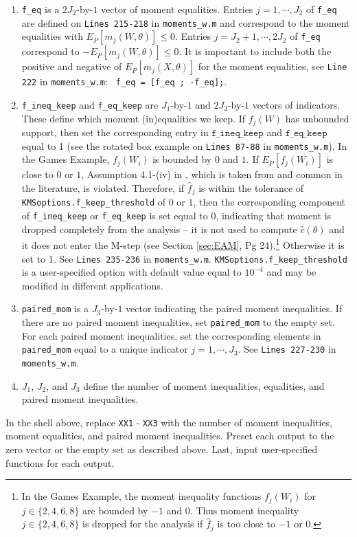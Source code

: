 \documentclass[12pt]{article}
\def\code#1{\texttt{#1}}
\begin{document}
\begin{enumerate}
    \item \code{f\_eq} is a $2 J_2$-by-$1$ vector of moment equalities.  Entries $j=1,\cdots,J_2$ of  \code{f\_eq} are defined on \code{Lines 215-218} in \code{moments\_w.m} and correspond to the moment equalities with $E_P[m_j(W,\theta)] \leq 0$.  Entries $j=J_2+1,\cdots,2J_2$ of  \code{f\_eq} correspond to  $-E_P[m_j(W,\theta)] \leq 0$.  It is important to include both the positive and negative of $E_P[m_j(X,\theta)]$ for the moment equalities, see \code{Line 222} in \code{moments\_w.m}: \code{ f\_eq = [f\_eq ; -f\_eq];}.

    \item  \code{f\_ineq\_keep} and  \code{f\_eq\_keep} are $J_1$-by-$1$ and $2 J_2$-by-$1$ vectors of indicators.  These define which moment (in)equalities we keep.  If $f_j(W)$ has unbounded support, then set the corresponding entry in $\code{f\_ineq\_keep}$ and $\code{f\_eq\_keep}$ equal to 1 (see the rotated box example on \code{Lines 87-88} in \code{moments\_w.m}).  In the Games Example, $f_j(W_i)$ is bounded by $0$ and $1$. If  $E_P[f_j(W_i)]$ is close to $0$ or $1$, Assumption 4.1-(iv) in , which is taken from  and common in the literature, is violated. Therefore, if $\hat f_{j}$ is within the tolerance of \code{KMSoptions.f\_keep\_threshold} of $0$ or $1$, then the corresponding component of  \code{f\_ineq\_keep} or \code{f\_eq\_keep} is set equal to 0, indicating that moment is dropped completely from the analysis -- it is not used to compute $\hat c(\theta)$ and it does not enter the M-step (see Section \ref{sec:EAM}, Pg 24).\footnote{In the Games Example, the moment inequality functions $f_j(W_i)$  for $j \in \{2,4,6,8\}$ are bounded by $-1$ and $0$.  Thus moment inequality $j  \in \{2,4,6,8\}$ is dropped for the analysis if $\hat f_j$ is too close to $-1$ or $0$.}   Otherwise it is set to 1.  See \code{Lines 235-236} in \code{moments\_w.m}.  \code{KMSoptions.f\_keep\_threshold} is a user-specified option with default value equal to $10^{-4}$ and may be modified in different applications.

    \item \code{paired\_mom} is a $J_3$-by-$1$ vector indicating the paired moment inequalities.  If there are no paired moment inequalities, set  \code{paired\_mom} to the empty set.  For each paired moment inequalities, set the corresponding elements in \code{paired\_mom} equal to a unique indicator $j = 1,\cdots,J_3$.  See \code{Lines 227-230}  in \code{moments\_w.m}.

    \item $J_1$, $J_2$, and $J_3$ define the number of moment inequalities, equalities, and paired moment inequalities.
\end{enumerate}
In the shell above, replace \code{XX1} - \code{XX3} with the number of moment inequalities, moment equalities, and paired moment inequalities.  Preset each output to the zero vector or the empty set as described above.  Last, input user-specified functions for each output.
\end{document}
